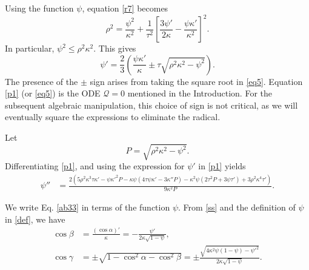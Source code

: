 \documentclass[a4paper,12pt]{amsart}
\theoremstyle{plain}
\theoremstyle{definition}
\begin{document}
Using the function $\psi$, equation \eqref{r7} becomes 
\begin{equation}\label{eq5}
\rho^2=  \frac{\psi^2}{\kappa^2} +\frac{1}{\tau^2}\left[  \frac{3\psi'}{2\kappa}-\frac{\psi\kappa'}{\kappa^2}   \right]^2.
\end{equation}
In particular, $\psi^2\leq \rho^2\kappa^2$. This gives
\begin{equation}\label{p1}
\psi'=\frac{2}{3} \left(\frac{\psi  \kappa '}{\kappa }\pm\tau  \sqrt{\rho ^2 \kappa ^2-\psi ^2}\right).
\end{equation}
The presence of the $\pm$ sign arises from taking the square root in \eqref{eq5}. Equation \eqref{p1} (or \eqref{eq5}) is  the ODE $\mathcal{Q}=0$ mentioned in the Introduction.  For the subsequent algebraic manipulation, this choice of sign is not critical, as we will eventually square the expressions to eliminate the radical.

Let
$$P=\sqrt{\rho ^2 \kappa ^2-\psi ^2}.$$
Differentiating \eqref{p1}, and using the expression for $\psi'$ in \eqref{p1} yields
\begin{equation}\label{p2}
\begin{split}
\psi''&=\frac{2 \left(5 \rho ^2 \kappa ^3 \tau  \kappa '-\psi  \kappa '^2 P-\kappa  \psi  \left(4 \tau  \psi  \kappa '-3 \kappa '' P\right)-\kappa ^2 \psi  \left(2 \tau ^2 P+3 \psi  \tau '\right)+3 \rho ^2 \kappa ^4 \tau '\right)}{9 \kappa ^2 P}.
\end{split}
\end{equation}


We write Eq. \eqref{ab33} in terms of the function $\psi$. From \eqref{ss} and the definition of $\psi$ in \eqref{def}, we have 
\begin{equation*}
\begin{split}
\cos\beta&=\frac{(\cos\alpha)'}{\kappa}=-\frac{\psi'}{2\kappa\sqrt{1-\psi}},\\
\cos\gamma&=\pm \sqrt{1-\cos^2\alpha-\cos^2\beta}=\pm\frac{\sqrt{4\kappa^2\psi(1-\psi)-\psi'^2}}{2\kappa\sqrt{1-\psi}}.
\end{split}
\end{equation*}
\end{document}
